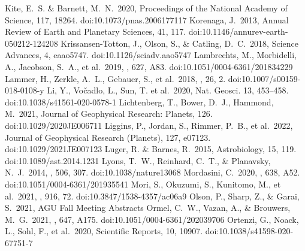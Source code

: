 \documentclass[bibyear,tradiabstract]{aa}
\begin{document}
\begin{thebibliography}{}
     Kite, E.~S. \& Barnett,     M.~N.\ 2020, Proceedings of the National Academy of Science, 117, 18264.    doi:10.1073/pnas.2006177117
     Korenaga, J.\ 2013, Annual Review of Earth and Planetary Sciences, 41, 117. doi:10.1146/annurev-earth-050212-124208
     Krissansen-Totton, J., Olson, S., \& Catling, D.~C.\ 2018, Science Advances, 4, eaao5747. doi:10.1126/sciadv.aao5747
     Lambrechts, M., Morbidelli, A., Jacobson, S.~A., et al.\ 2019, \aap, 627, A83. doi:10.1051/0004-6361/201834229
     Lammer, H., Zerkle, A.~L., Gebauer, S., et al.\ 2018, \aapr, 26, 2. doi:10.1007/s00159-018-0108-y
     Li, Y., Vočadlo, L., Sun, T. et al.\ 2020, Nat. Geosci. 13, 453–458. doi:10.1038/s41561-020-0578-1
     Lichtenberg, T., Bower, D.~J., Hammond, M.\ 2021, Journal of Geophysical Research: Planets, 126. doi:10.1029/2020JE006711
     Liggins, P., Jordan, S., Rimmer, P.~B., et al.\ 2022, Journal of Geophysical Research (Planets), 127, e07123. doi:10.1029/2021JE007123
     Luger, R. \& Barnes, R.\ 2015, Astrobiology, 15, 119. doi:10.1089/ast.2014.1231
     Lyons, T.~W., Reinhard, C.~T., \& Planavsky, N.~J.\ 2014, \nat, 506, 307. doi:10.1038/nature13068
     Mordasini, C.\ 2020, \aap, 638, A52. doi:10.1051/0004-6361/201935541
     Mori, S., Okuzumi, S., Kunitomo, M., et al.\ 2021, \apj, 916, 72. doi:10.3847/1538-4357/ac06a9
     Olson, P., Sharp, Z., \& Garai, S.\ 2021, AGU Fall Meeting Abstracts
     Ormel, C.~W., Vazan, A., \& Brouwers, M.~G.\ 2021, \aap, 647, A175. doi:10.1051/0004-6361/202039706
     Ortenzi, G., Noack, L., Sohl, F., et al.\ 2020, Scientific Reports, 10, 10907. doi:10.1038/s41598-020-67751-7

\end{thebibliography}
\end{document}
